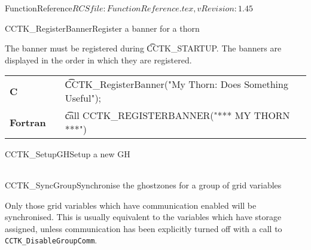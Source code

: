 \begin{cactuspart}{5}{FunctionReference}{$RCSfile: FunctionReference.tex,v $}{$Revision: 1.45 $}
\begin{CCTKFunc}{CCTK\_RegisterBanner}{Register a banner for a thorn}
\label{CCTK-RegisterBanner}
\showargs
\begin{params}
\end{params}
\begin{discussion}
The banner must be registered during {\t CCTK\_STARTUP}. The banners are
displayed in the order in which they are registered.
\end{discussion}
\begin{examples}
\begin{tabular}{@{}p{3cm}cp{11cm}}
\hfill {\bf C} && {\t CCTK\_RegisterBanner("My Thorn: Does Something Useful")};
\\
\hfill {\bf Fortran} && {\t call CCTK\_REGISTERBANNER("*** MY THORN ***")}
\\
\end{tabular}
\end{examples}
\begin{errorcodes}
\end{errorcodes}
\end{CCTKFunc}




\begin{CCTKFunc}{CCTK\_SetupGH}{Setup a new GH}
\label{CCTK-SetupGH}
\showcargs
\begin{params}
\end{params}
\begin{discussion}
\end{discussion}
\begin{examples}
\begin{tabular}{@{}p{3cm}cp{11cm}}
\end{tabular}
\end{examples}
\begin{errorcodes}
\end{errorcodes}
\end{CCTKFunc}




\begin{CCTKFunc}{CCTK\_SyncGroup}{Synchronise the ghostzones for a group of grid variables}
\label{CCTK-SyncGroup}
\showargs
\begin{params}
\end{params}
\begin{discussion}
Only those grid variables which have communication enabled
will be synchronised. This is usually equivalent to the variables
which have storage assigned, unless communication has been explicitly
turned off with a call to {\tt CCTK\_DisableGroupComm}.


\end{discussion}
\end{CCTKFunc}
\end{cactuspart}
